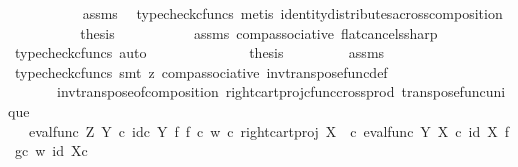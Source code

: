 \begin{isabellebody}
\ \ \ \ \ \ \ \ \ \isamarkupfalse%
\ assms\ \isamarkupfalse%
\ {\isacharparenleft}{\kern0pt}typecheck{\isacharunderscore}{\kern0pt}cfuncs{\isacharcomma}{\kern0pt}\ metis\ identity{\isacharunderscore}{\kern0pt}distributes{\isacharunderscore}{\kern0pt}across{\isacharunderscore}{\kern0pt}composition{\isacharparenright}{\kern0pt}\isanewline
\ \ \ \ \ \ \ \isamarkupfalse%
\ \isamarkupfalse%
\ {\isacharquery}{\kern0pt}thesis\isanewline
\ \ \ \ \ \ \ \ \ \isamarkupfalse%
\ assms\ comp{\isacharunderscore}{\kern0pt}associative{}\ flat{\isacharunderscore}{\kern0pt}cancels{\isacharunderscore}{\kern0pt}sharp\ \isamarkupfalse%
\ {\isacharparenleft}{\kern0pt}typecheck{\isacharunderscore}{\kern0pt}cfuncs{\isacharcomma}{\kern0pt}\ auto{\isacharparenright}{\kern0pt}\isanewline
\ \ \ \ \ \isamarkupfalse%
\isanewline
\ \ \ \ \ \isamarkupfalse%
\ \isamarkupfalse%
\ {\isacharquery}{\kern0pt}thesis\isanewline
\ \ \ \ \ \ \ \isamarkupfalse%
\ assms\ \isamarkupfalse%
\ {\isacharparenleft}{\kern0pt}typecheck{\isacharunderscore}{\kern0pt}cfuncs{\isacharcomma}{\kern0pt}\ smt\ {\isacharparenleft}{\kern0pt}z{}{\isacharparenright}{\kern0pt}\ comp{\isacharunderscore}{\kern0pt}associative{}\ inv{\isacharunderscore}{\kern0pt}transpose{\isacharunderscore}{\kern0pt}func{\isacharunderscore}{\kern0pt}def{}\ \isanewline
\ \ \ \ \ \ \ inv{\isacharunderscore}{\kern0pt}transpose{\isacharunderscore}{\kern0pt}of{\isacharunderscore}{\kern0pt}composition\ right{\isacharunderscore}{\kern0pt}cart{\isacharunderscore}{\kern0pt}proj{\isacharunderscore}{\kern0pt}cfunc{\isacharunderscore}{\kern0pt}cross{\isacharunderscore}{\kern0pt}prod\ transpose{\isacharunderscore}{\kern0pt}func{\isacharunderscore}{\kern0pt}unique{\isacharparenright}{\kern0pt}\isanewline
\ \ \isamarkupfalse%
\isanewline
\ \ \isamarkupfalse%
\ \isamarkupfalse%
\ {\isachardoublequoteopen}{\isachardot}{\kern0pt}{\isachardot}{\kern0pt}{\isachardot}{\kern0pt}\ {\isacharequal}{\kern0pt}\ {\isacharparenleft}{\kern0pt}eval{\isacharunderscore}{\kern0pt}func\ Z\ Y\ {\isasymcirc}\isactrlsub c\ {\isacharparenleft}{\kern0pt}id\isactrlsub c\ Y\ {\isasymtimes}\isactrlsub f\ {\isacharparenleft}{\kern0pt}{\isacharparenleft}{\kern0pt}f\ {\isasymcirc}\isactrlsub c\ w{\isacharparenright}{\kern0pt}\ {\isasymcirc}\isactrlsub c\ right{\isacharunderscore}{\kern0pt}cart{\isacharunderscore}{\kern0pt}proj\ X\ {\isasymone}{\isacharparenright}{\kern0pt}{\isacharparenright}{\kern0pt}\ {\isasymcirc}\isactrlsub c\ {\isasymlangle}eval{\isacharunderscore}{\kern0pt}func\ Y\ X\ {\isasymcirc}\isactrlsub c\ {\isacharparenleft}{\kern0pt}id\ X\ {\isasymtimes}\isactrlsub f\ {\isacharparenleft}{\kern0pt}g{\isasymcirc}\isactrlsub c\ w{\isacharparenright}{\kern0pt}{\isacharparenright}{\kern0pt}{\isacharcomma}{\kern0pt}\ id\ {\isacharparenleft}{\kern0pt}X{\isasymtimes}\isactrlsub c\ {\isasymone}{\isacharparenright}{\kern0pt}{\isasymrangle}{\isacharparenright}{\kern0pt}\isactrlsup {\isasymsharp}{\isachardoublequoteclose}\isanewline

\end{isabellebody}
